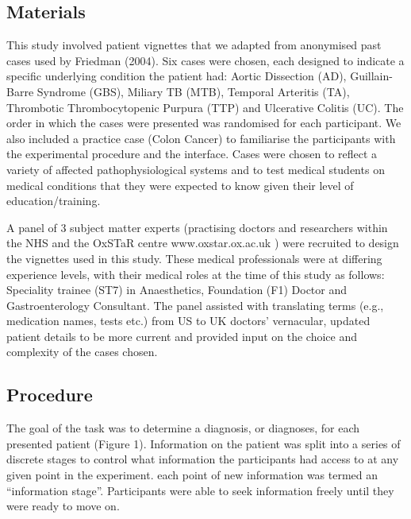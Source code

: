 \documentclass[a4paper, nobind]{templates/ociamthesis}
\begin{document}
\subsection*{Materials}\label{materials}

This study involved patient vignettes that we adapted from anonymised past cases used by Friedman (2004). Six cases were chosen, each designed to indicate a specific underlying condition the patient had: Aortic Dissection (AD), Guillain-Barre Syndrome (GBS), Miliary TB (MTB), Temporal Arteritis (TA), Thrombotic Thrombocytopenic Purpura (TTP) and Ulcerative Colitis (UC). The order in which the cases were presented was randomised for each participant. We also included a practice case (Colon Cancer) to familiarise the participants with the experimental procedure and the interface. Cases were chosen to reflect a variety of affected pathophysiological systems and to test medical students on medical conditions that they were expected to know given their level of education/training.

A panel of 3 subject matter experts (practising doctors and researchers within the NHS and the OxSTaR centre www.oxstar.ox.ac.uk ) were recruited to design the vignettes used in this study. These medical professionals were at differing experience levels, with their medical roles at the time of this study as follows: Speciality trainee (ST7) in Anaesthetics, Foundation (F1) Doctor and Gastroenterology Consultant. The panel assisted with translating terms (e.g., medication names, tests etc.) from US to UK doctors' vernacular, updated patient details to be more current and provided input on the choice and complexity of the cases chosen.

\subsection*{Procedure}\label{procedure}

The goal of the task was to determine a diagnosis, or diagnoses, for each presented patient (Figure 1). Information on the patient was split into a series of discrete stages to control what information the participants had access to at any given point in the experiment. each point of new information was termed an ``information stage''. Participants were able to seek information freely until they were ready to move on.
\end{document}
